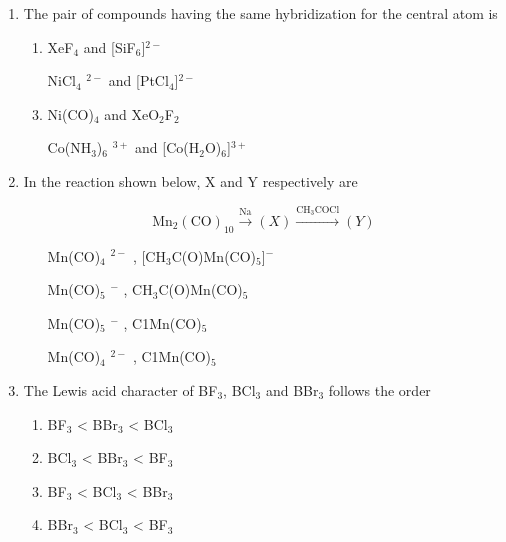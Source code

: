 \documentclass[journal,12pt,onecolumn]{IEEEtran}
\theoremstyle{remark}
\begin{document}
\begin{enumerate}
\item The pair of compounds having the same hybridization for the central atom is  \hfill{}

\begin{center}
    

\begin{multicols}{2}
\begin{enumerate} 
 \item   XeF$_4$ and [SiF$_6$]$^{2-}$  
 \item   [NiCl$_4$]$^{2-}$ and [PtCl$_4$]$^{2-}$  
 \item   Ni(CO)$_4$ and XeO$_2$F$_2$  
 \item   [Co(NH$_3$)$_6$]$^{3+}$ and [Co(H$_2$O)$_6$]$^{3+}$  
\end{enumerate}
\end{multicols}

\end{center}


\item In the reaction shown below, X and Y respectively are  \hfill{}

\[
\text{Mn}_2(\text{CO})_{10} \xrightarrow{\text{Na}} (X) \xrightarrow{\text{CH}_3\text{COCl}} (Y)
\]

\begin{multicols}{2}
\begin{enumerate} 
 \item   [Mn(CO)$_4$]$^{2-}$ , [CH$_3$C(O)Mn(CO)$_5$]$^{-}$  
 \item   [Mn(CO)$_5$]$^{-}$ , CH$_3$C(O)Mn(CO)$_5$  
 \item   [Mn(CO)$_5$]$^{-}$ , C1Mn(CO)$_5$  
 \item   [Mn(CO)$_4$]$^{2-}$ , C1Mn(CO)$_5$  
\end{enumerate}
\end{multicols}
  

\item The Lewis acid character of BF$_3$, BCl$_3$ and BBr$_3$ follows the order  \hfill{}

\begin{multicols}{2}
\begin{enumerate} 
\item BF$_3$ < BBr$_3$ < BCl$_3$  
\item BCl$_3$ < BBr$_3$ < BF$_3$  
\item BF$_3$ < BCl$_3$ < BBr$_3$  
\item BBr$_3$ < BCl$_3$ < BF$_3$  
\end{enumerate}
\end{multicols}
  


\end{enumerate}
\end{document}
